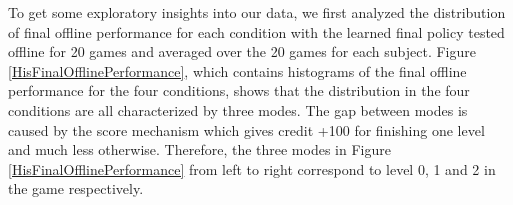 \documentclass[10pt,journal,compsoc]{IEEEtran}
\begin{document}
%
%
%
%

To get some exploratory insights into our data, we first analyzed the distribution of final offline performance for each condition with the learned final policy tested offline for 20 games and averaged over the 20 games for each subject. %
Figure \ref{HisFinalOfflinePerformance}, which contains histograms of the final offline performance for the four conditions, shows that the distribution in the four conditions are all characterized by three modes. The gap between modes is caused by the score mechanism which gives credit +100 for finishing one level and much less otherwise. Therefore, the three modes in Figure \ref{HisFinalOfflinePerformance} from left to right correspond to level 0, 1 and 2 in the game respectively.
\end{document}
